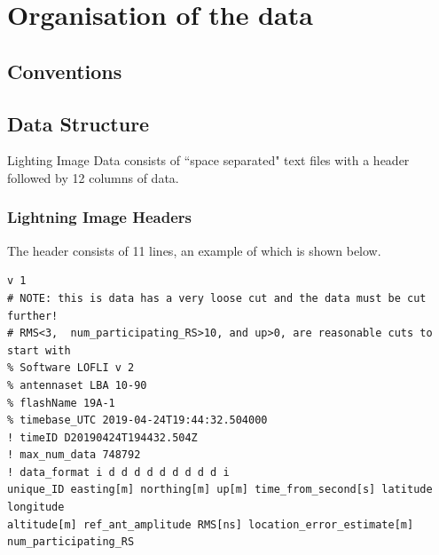 \documentclass[a4paper,10pt,bibtotoc]{scrartcl}
\begin{document}
\clearpage

\section{Organisation of the data}
\label{sec:structure}

\subsection{Conventions}






\subsection{Data Structure}


Lighting Image Data consists of ``space separated" text files with a header followed by 12 columns of data. 

\subsubsection{Lightning Image Headers}
The header consists of 11 lines, an example of which is shown below.

\begin{verbatim}
v 1
# NOTE: this is data has a very loose cut and the data must be cut further!
# RMS<3,  num_participating_RS>10, and up>0, are reasonable cuts to start with
% Software LOFLI v 2
% antennaset LBA 10-90 
% flashName 19A-1
% timebase_UTC 2019-04-24T19:44:32.504000
! timeID D20190424T194432.504Z
! max_num_data 748792
! data_format i d d d d d d d d d i
unique_ID easting[m] northing[m] up[m] time_from_second[s] latitude longitude
altitude[m] ref_ant_amplitude RMS[ns] location_error_estimate[m] num_participating_RS 

\end{verbatim}

\end{document}
